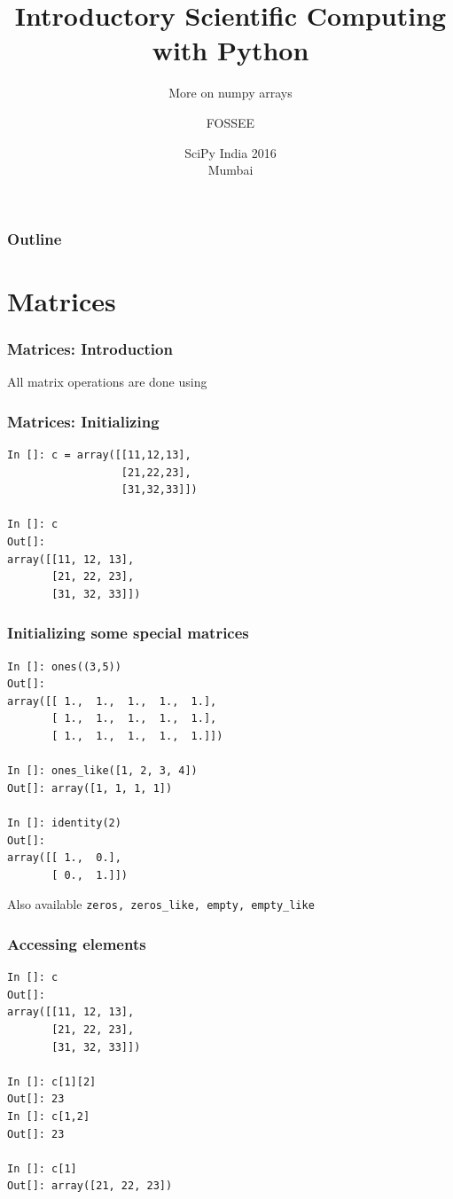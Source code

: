 \documentclass[14pt,compress]{beamer}
\title[More on numpy arrays]{Introductory Scientific Computing with
Python}
\subtitle{More on numpy arrays}
\author[FOSSEE] {FOSSEE}
\institute[FOSSEE -- IITB] {Department of Aerospace Engineering\\IIT Bombay}
\date[] {SciPy India 2016\\
Mumbai
}
\newcommand{\typ}[1]{\lstinline{#1}}
\newcommand{\kwrd}[1]{ \texttt{\textbf{\color{blue}{#1}}}  }
\begin{document}
\begin{frame}
  \titlepage
\end{frame}

\begin{frame}
  \frametitle{Outline}
  \tableofcontents
\end{frame}

\section{Matrices}

\begin{frame}
\frametitle{Matrices: Introduction}
\alert{All matrix operations are done using \kwrd{arrays}}
\end{frame}

\begin{frame}[fragile]
\frametitle{Matrices: Initializing}
\begin{lstlisting}
In []: c = array([[11,12,13],
                  [21,22,23],
                  [31,32,33]])

In []: c
Out[]:
array([[11, 12, 13],
       [21, 22, 23],
       [31, 32, 33]])
\end{lstlisting}
\end{frame}

\begin{frame}[fragile]
\frametitle{Initializing some special matrices}
\begin{small}
  \begin{lstlisting}
In []: ones((3,5))
Out[]:
array([[ 1.,  1.,  1.,  1.,  1.],
       [ 1.,  1.,  1.,  1.,  1.],
       [ 1.,  1.,  1.,  1.,  1.]])

In []: ones_like([1, 2, 3, 4])
Out[]: array([1, 1, 1, 1])

In []: identity(2)
Out[]:
array([[ 1.,  0.],
       [ 0.,  1.]])
  \end{lstlisting}
Also available \alert{\typ{zeros, zeros_like, empty, empty_like}}
\end{small}
\end{frame}


\begin{frame}[fragile]
  \frametitle{Accessing elements}
  \begin{small}
  \begin{lstlisting}
In []: c
Out[]:
array([[11, 12, 13],
       [21, 22, 23],
       [31, 32, 33]])

In []: c[1][2]
Out[]: 23
In []: c[1,2]
Out[]: 23

In []: c[1]
Out[]: array([21, 22, 23])
  \end{lstlisting}
  \end{small}
\end{frame}
\end{document}
